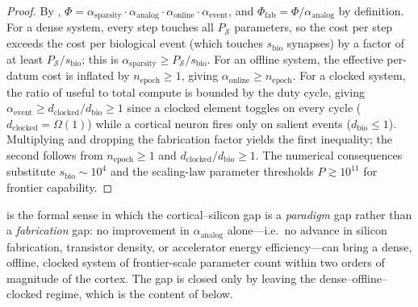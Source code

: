 \documentclass[11pt]{article}
\theoremstyle{definition}
\theoremstyle{remark}
\newcommand{\Sys}{\mathcal{S}}
\begin{document}
\begin{proof}
By , $\Phi=\alpha_{\mathrm{sparsity}}\cdot
\alpha_{\mathrm{analog}}\cdot\alpha_{\mathrm{online}}\cdot
\alpha_{\mathrm{event}}$, and
$\Phi_{\mathrm{fab}}=\Phi/\alpha_{\mathrm{analog}}$ by definition.
For a dense system, every step touches all $P_{\mathrm{\Sys}}$
parameters, so the cost per step exceeds the cost per biological
event (which touches $s_{\mathrm{bio}}$ synapses) by a factor of at
least $P_{\mathrm{\Sys}}/s_{\mathrm{bio}}$; this is
$\alpha_{\mathrm{sparsity}}\ge P_{\mathrm{\Sys}}/s_{\mathrm{bio}}$.
For an offline system, the effective per-datum cost is inflated by
$n_{\mathrm{epoch}}\ge 1$, giving
$\alpha_{\mathrm{online}}\ge n_{\mathrm{epoch}}$.  For a clocked
system, the ratio of useful to total compute is bounded by the duty
cycle, giving
$\alpha_{\mathrm{event}}\ge d_{\mathrm{clocked}}/d_{\mathrm{bio}}\ge
1$ since a clocked element toggles on every cycle
($d_{\mathrm{clocked}}=\Omega(1)$) while a cortical neuron fires
only on salient events ($d_{\mathrm{bio}}\le 1$).  Multiplying and
dropping the fabrication factor yields the first inequality; the
second follows from $n_{\mathrm{epoch}}\ge 1$ and
$d_{\mathrm{clocked}}/d_{\mathrm{bio}}\ge 1$.  The numerical
consequences substitute $s_{\mathrm{bio}}\sim 10^{4}$ and the
scaling-law parameter thresholds $P\gtrsim 10^{11}$ for frontier
capability.
\end{proof}

 is the formal sense in which the
cortical--silicon gap is a \emph{paradigm} gap rather than a
\emph{fabrication} gap: no improvement in $\alpha_{\mathrm{analog}}$
alone---i.e.\ no advance in silicon fabrication, transistor density,
or accelerator energy efficiency---can bring a dense, offline,
clocked system of frontier-scale parameter count within two orders
of magnitude of the cortex.  The gap is closed only by leaving the
dense--offline--clocked regime, which is the content of
 below.
\end{document}
